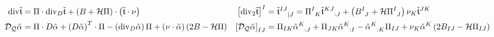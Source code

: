\documentclass[a4paper,7pt]{scrartcl}
\newcommand{\mean}{\mathcal{H}}
\renewcommand{\div}{\mathrm{div}}
\newcommand{\dq}{\mathcal{D}_{\mathcal{Q}}}
\newcommand{\pism}{\Pi}
\newcommand{\pissf}[2]{\tensor{\pism}{^{#1}_{#2}}}
\newcommand{\bsf}[2]{\tensor{B}{^{#1}_{#2}}}
\newcommand{\talpha}{\tilde{\alpha}}
\newcommand{\tsym}{\mathfrak{t}}
\newcommand{\ttsym}{\tilde{\tsym}}
\begin{document}
\begin{align*}
   \div\ttsym &= \pism\cdot\div_{D}\ttsym + \left( B + \mean\pism \right)\cdot\left( \ttsym\cdot\nu \right)
          &\left[ \div_{2}\ttsym \right]^{I} 
              &= \tensor{\ttsym}{^{IJ}_{|J}}
               = \pissf{I}{K}\tensor{\ttsym}{^{KJ}_{:J}} + \left( \bsf{I}{J} + \mean\pissf{I}{J} \right) \nu_{K} \ttsym^{JK}\\
   \dq\talpha &= \pism\cdot D\talpha + \left( D\talpha \right)^{T} \cdot \pism - \left( \div_{D}\talpha \right)\pism
                  +\left( \nu\cdot\talpha \right)\left( 2B - \mean\pism \right)
         &\left[ \dq\talpha \right]_{IJ} &= \pism_{IK}\tensor{\talpha}{^{K}_{:J}} + \pism_{JK}\tensor{\talpha}{^{K}_{:I}} - \tensor{\talpha}{^{K}_{:K}}\pism_{IJ}
            +\nu_{K}\talpha^{K}\left( 2B_{IJ} - \mean\pism_{IJ} \right)
  \end{align*}
\end{document}
